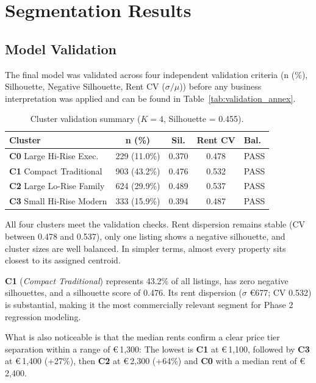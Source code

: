 \documentclass[10pt,a4paper,twocolumn]{article}
\newcommand{\cluster}[1]{\textbf{C#1}}
\newcommand{\eur}[1]{€\,#1}
\newcommand{\seg}[1]{\textit{#1}}          %
\begin{document}
\section{Segmentation Results}

\subsection{Model Validation}

The final model was validated across four independent validation criteria (n (\%), Silhouette, Negative Silhouette, Rent CV ($\sigma/\mu$)) before any business interpretation was applied and can be found in Table~\ref{tab:validation_annex}.
\begin{table}[H]
\centering
\caption{Cluster validation summary ($K\!=\!4$, Silhouette = 0.455).}
\label{tab:validation}
\small
\setlength{\tabcolsep}{3pt}
\begin{tabular}{@{}lcccl@{}}
\toprule
\textbf{Cluster} & \textbf{n (\%)} & \textbf{Sil.} & \textbf{Rent CV} & \textbf{Bal.} \\
\midrule
\cluster{0} Large Hi-Rise Exec. & 229 (11.0\%) & 0.370 & 0.478 & \textcolor{passgreen}{PASS} \\
\cluster{1} Compact Traditional & 903 (43.2\%) & 0.476 & 0.532 & \textcolor{passgreen}{PASS} \\
\cluster{2} Large Lo-Rise Family & 624 (29.9\%) & 0.489 & 0.537 & \textcolor{passgreen}{PASS} \\
\cluster{3} Small Hi-Rise Modern & 333 (15.9\%) & 0.394 & 0.487 & \textcolor{passgreen}{PASS} \\
\bottomrule
\end{tabular}
\end{table}

All four clusters meet the validation checks. Rent dispersion remains stable (CV between 0.478 and 0.537), only one listing shows a negative silhouette, and cluster sizes are well balanced. In simpler terms, almost every property sits closest to its assigned centroid. 

\cluster{1} (\seg{Compact Traditional}) represents 43.2\% of all listings, has zero negative silhouettes, and a silhouette score of 0.476. Its rent dispersion ($\sigma$ €677; CV 0.532) is substantial, making it the most commercially relevant segment for Phase 2 regression modeling. 

What is also noticeable is that the median rents confirm a clear price tier separation within a range of \eur{1,300}: The lowest is \cluster{1} at \eur{1,100}, followed by \cluster{3} at \eur{1,400} (+27\%), then \cluster{2} at \eur{2,300} (+64\%) and \cluster{0} with a median rent of \eur{2,400}.
\end{document}
